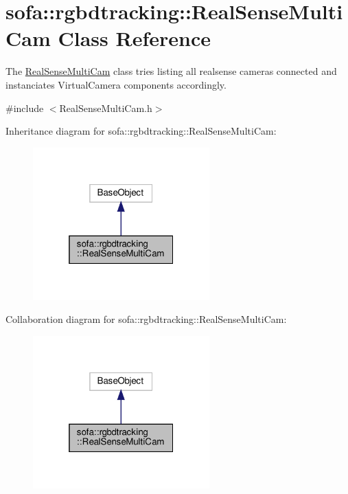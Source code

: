 \hypertarget{classsofa_1_1rgbdtracking_1_1_real_sense_multi_cam}{}\section{sofa\+:\+:rgbdtracking\+:\+:Real\+Sense\+Multi\+Cam Class Reference}
\label{classsofa_1_1rgbdtracking_1_1_real_sense_multi_cam}


The \hyperlink{classsofa_1_1rgbdtracking_1_1_real_sense_multi_cam}{Real\+Sense\+Multi\+Cam} class tries listing all realsense cameras connected and instanciates Virtual\+Camera components accordingly.  




{\ttfamily \#include $<$Real\+Sense\+Multi\+Cam.\+h$>$}



Inheritance diagram for sofa\+:\+:rgbdtracking\+:\+:Real\+Sense\+Multi\+Cam\+:
\nopagebreak
\begin{figure}[H]
\begin{center}
\leavevmode
\includegraphics[width=193pt]{classsofa_1_1rgbdtracking_1_1_real_sense_multi_cam__inherit__graph}
\end{center}
\end{figure}


Collaboration diagram for sofa\+:\+:rgbdtracking\+:\+:Real\+Sense\+Multi\+Cam\+:
\nopagebreak
\begin{figure}[H]
\begin{center}
\leavevmode
\includegraphics[width=193pt]{classsofa_1_1rgbdtracking_1_1_real_sense_multi_cam__coll__graph}
\end{center}
\end{figure}
